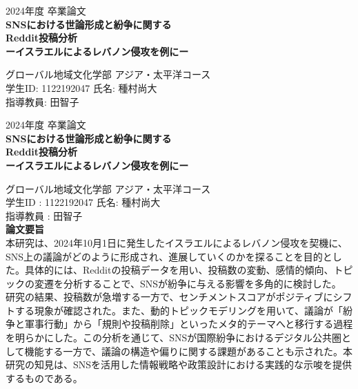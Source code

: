 \documentclass[11pt, a4j]{jreport}
\begin{document}
    \thispagestyle{empty}

    \begin{center}
        \vspace*{20mm}
        {\LARGE\noindent 2024年度 卒業論文}\\
        \vspace{5mm}
        {\huge\noindent\textbf{SNSにおける世論形成と紛争に関する\\
        Reddit投稿分析}}\\
        \medskip
        {\huge\noindent\textbf{ーイスラエルによるレバノン侵攻を例にー}}
    \end{center}
    
    \vfill
    
    \begin{center}
        {\Large\noindent グローバル地域文化学部 アジア・太平洋コース}\\
        \vspace{\baselineskip}
        {\Large\noindent 学生ID: 1122192047 氏名: 種村尚大}\\
        \vspace{\baselineskip}
        {\Large\noindent 指導教員: 田智子}
    \end{center}

    \thispagestyle{empty}
    \clearpage


    \begin{center}
        {\Large 2024年度 卒業論文} \\[5mm]
        {\Large \textbf{SNSにおける世論形成と紛争に関する\\
        Reddit投稿分析\\
        ーイスラエルによるレバノン侵攻を例にー}} \\[15mm]
    \end{center}
    
    \noindent
    グローバル地域文化学部 アジア・太平洋コース \\
    学生ID : 1122192047 氏名: 種村尚大 \\
    指導教員 : 田智子 \\[15mm]
    
    \noindent
    {\Large \textbf{論文要旨}} \\[5mm]
    \quad 本研究は、2024年10月1日に発生したイスラエルによるレバノン侵攻を契機に、SNS上の議論がどのように形成され、進展していくのかを探ることを目的とした。具体的には、Redditの投稿データを用い、投稿数の変動、感情的傾向、トピックの変遷を分析することで、SNSが紛争に与える影響を多角的に検討した。\\
    \quad 研究の結果、投稿数が急増する一方で、センチメントスコアがポジティブにシフトする現象が確認された。また、動的トピックモデリングを用いて、議論が「紛争と軍事行動」から「規則や投稿削除」といったメタ的テーマへと移行する過程を明らかにした。この分析を通じて、SNSが国際紛争におけるデジタル公共圏として機能する一方で、議論の構造や偏りに関する課題があることも示された。本研究の知見は、SNSを活用した情報戦略や政策設計における実践的な示唆を提供するものである。 \\[20mm]
    
\end{document}
